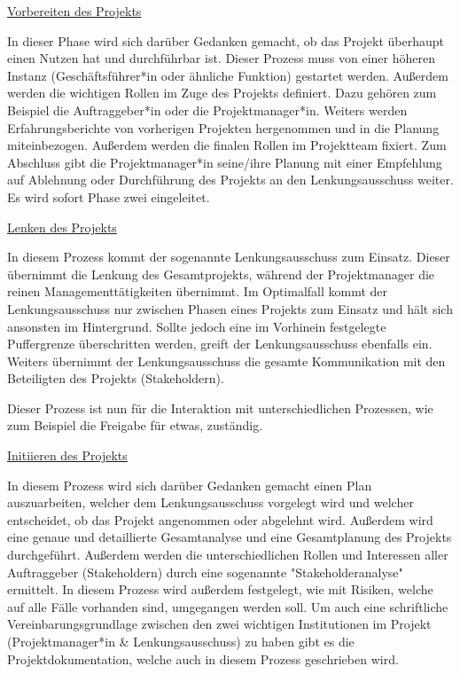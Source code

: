 \underline{Vorbereiten des Projekts}

In dieser Phase wird sich darüber Gedanken gemacht, ob das Projekt überhaupt einen Nutzen hat und durchführbar ist. Dieser Prozess muss von einer höheren Instanz (Geschäftsführer*in oder ähnliche Funktion) gestartet werden. Außerdem werden die wichtigen Rollen im Zuge des Projekts definiert. Dazu gehören zum Beispiel die Auftraggeber*in oder die Projektmanager*in. Weiters werden Erfahrungsberichte von vorherigen Projekten hergenommen und in die Planung miteinbezogen. Außerdem werden die finalen Rollen im Projektteam fixiert. Zum Abschluss gibt die Projektmanager*in seine/ihre Planung mit einer Empfehlung auf Ablehnung oder Durchführung des Projekts an den Lenkungsausschuss weiter. Es wird sofort Phase zwei eingeleitet. \cite{Prince2}

\underline{Lenken des Projekts}

In diesem Prozess kommt der sogenannte Lenkungsausschuss zum Einsatz. Dieser übernimmt die Lenkung des Gesamtprojekts, während der Projektmanager die reinen Managementtätigkeiten übernimmt. Im Optimalfall kommt der Lenkungsausschuss nur zwischen Phasen eines Projekts zum Einsatz und hält sich ansonsten im Hintergrund. Sollte jedoch eine im Vorhinein festgelegte Puffergrenze überschritten werden, greift der Lenkungsausschuss ebenfalls ein. Weiters übernimmt der Lenkungsausschuss die gesamte Kommunikation mit den Beteiligten des Projekts (Stakeholdern). \cite{Prince2}

Dieser Prozess ist nun für die Interaktion mit unterschiedlichen Prozessen, wie zum Beispiel die Freigabe für etwas, zuständig. \cite{Prince2}

\underline{Initiieren des Projekts}

In diesem Prozess wird sich darüber Gedanken gemacht einen Plan auszuarbeiten, welcher dem Lenkungsausschuss vorgelegt wird und welcher entscheidet, ob das Projekt angenommen oder abgelehnt wird. Außerdem wird eine genaue und detaillierte Gesamtanalyse und eine Gesamtplanung des Projekts durchgeführt. Außerdem werden die unterschiedlichen Rollen und Interessen aller Auftraggeber (Stakeholdern) durch eine sogenannte "Stakeholderanalyse" ermittelt. In diesem Prozess wird außerdem festgelegt, wie mit Risiken, welche auf alle Fälle vorhanden sind, umgegangen werden soll. Um auch eine schriftliche Vereinbarungsgrundlage zwischen den zwei wichtigen Institutionen im Projekt (Projektmanager*in \& Lenkungsausschuss) zu haben gibt es die Projektdokumentation, welche auch in diesem Prozess geschrieben wird. \cite{Prince2} \cite{Stakeholder}

